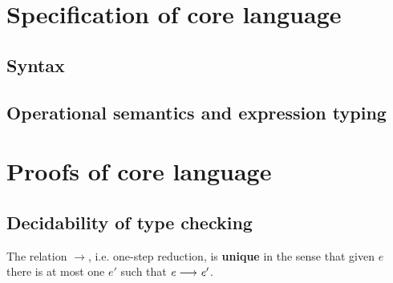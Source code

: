 \section{Specification of core language}

\subsection{Syntax}
\gram{\otte\ottinterrule
        \otts\ottinterrule
        \ottG\ottinterrule
        \ottv}

\subsection{Operational semantics and expression typing}
\ottdefnstep{}
\ottusedrule{\ottdruleSXXMu{}}
\ottdefnexpr{}
\ottusedrule{\ottdruleTXXMu{}}

\section{Proofs of core language}
\subsection{Decidability of type checking}
\begin{lem}
	The relation $ \longrightarrow $, i.e. one-step reduction, is \textbf{unique} in the sense that given $e$ there is at most one $e'$ such that $\mathit{e}  \longrightarrow  \mathit{e'}$.
\end{lem}

